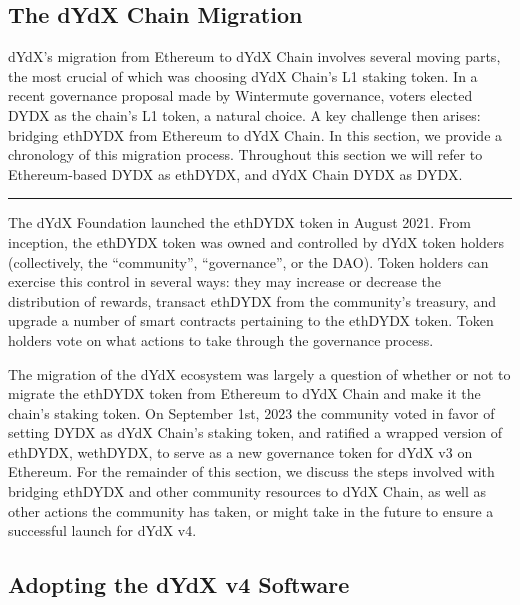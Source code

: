 \begin{fullwidth}
    \section{The dYdX Chain Migration} \label{sec:migration}

    \begin{adjustwidth}{2cm}{2cm}
        \justify
        dYdX's migration from Ethereum to dYdX Chain involves several moving parts, the most crucial of which was choosing dYdX Chain's L1 staking token. In a recent governance proposal made by Wintermute governance, voters elected DYDX as the chain's L1 token, a natural choice. A key challenge then arises: bridging ethDYDX from Ethereum to dYdX Chain. In this section, we provide a chronology of this migration process. Throughout this section we will refer to Ethereum-based DYDX as ethDYDX, and dYdX Chain DYDX as DYDX.
    \end{adjustwidth}
    
    \textcolor{gray}{\rule{\linewidth}{0.1mm}}
    
\end{fullwidth}

    The dYdX Foundation launched the ethDYDX token in August 2021. From inception, the ethDYDX token was owned and controlled by dYdX token holders (collectively, the ``community'', ``governance'', or the DAO). Token holders can exercise this control in several ways: they may increase or decrease the distribution of rewards, transact ethDYDX from the community's treasury, and upgrade a number of smart contracts pertaining to the ethDYDX token. Token holders vote on what actions to take through the governance process. 

    The migration of the dYdX ecosystem was largely a question of whether or not to migrate the ethDYDX token from Ethereum to dYdX Chain and make it the chain's staking token. On September 1st, 2023 the community voted in favor of setting DYDX as dYdX Chain's staking token, and ratified a wrapped version of ethDYDX, wethDYDX, to serve as a new governance token for dYdX v3 on Ethereum. For the remainder of this section, we discuss the steps involved with bridging ethDYDX and other community resources to dYdX Chain, as well as other actions the community has taken, or might take in the future to ensure a successful launch for dYdX v4.

    \subsection{Adopting the dYdX v4 Software}

